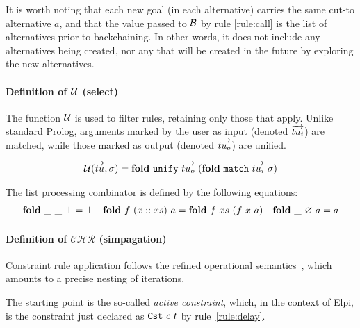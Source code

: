 \documentclass[a4paper, 11pt]{book}
\begin{document}
It is worth noting that each new goal (in each alternative) carries the same
cut-to alternative $a$, and that the value passed to $\mathcal{B}$ by rule
\ref{rule:call} is the list of alternatives prior to backchaining. In other
words, it does not include any alternatives being created, nor any that will be
created in the future by exploring the new alternatives.

\paragraph{Definition of $\mathcal{U}$ (select)}

The function $\mathcal{U}$ is used to filter rules, retaining only those that
apply. Unlike standard Prolog, arguments marked by the user as input (denoted
$\vecL{tu_i}$) are matched, while those marked as output (denoted
$\vecL{tu_o}$) are unified.

  $$
  \begin{array}{l}
  \cselect(\vecL{tu}, \subst) = \fold\ \unify\ \vecL{tu_o}\ (\fold\ \match\ \vecL{tu_i}\ \subst)
  \end{array}
  $$

The list processing combinator \fold is defined by the following equations:
$$
\begin{array}{lll}
\fold\ \_\ \_\ \bot = \bot & \fold\ f\ (x :: xs)\ a = \fold\ f\ xs\ (f\ x\ a) & \fold\ \_\ \EmptyList\ a = a
\end{array}
$$

\paragraph{Definition of $\mathcal{CHR}$ (simpagation)}
 

Constraint rule application follows the refined operational
semantics~\cite{10.1007/978-3-540-27775-0_7}, which amounts to a precise
nesting of iterations.

The starting point is the so-called \emph{active constraint}, which, in the context
of Elpi, is the constraint just declared as $\texttt{Cst}\ c\ t$ by rule~\ref{rule:delay}.
\end{document}
